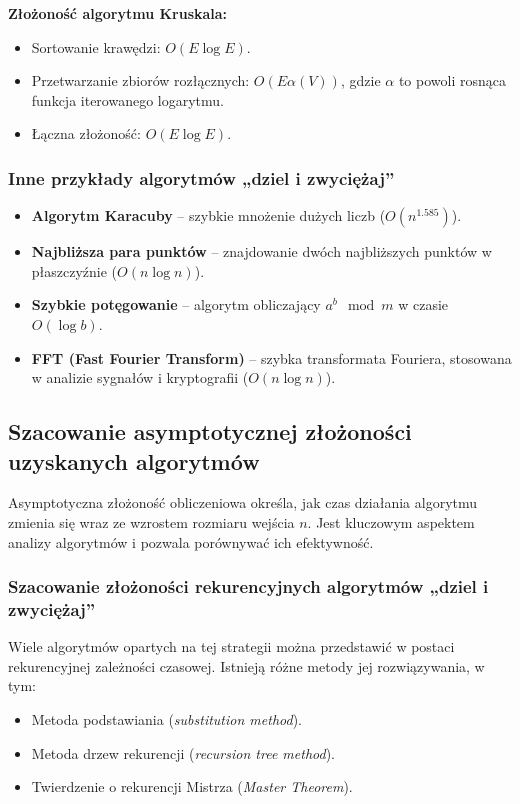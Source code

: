 \textbf{Złożoność algorytmu Kruskala:}
\begin{itemize}
    \item Sortowanie krawędzi: \( O(E \log E) \).
    \item Przetwarzanie zbiorów rozłącznych: \( O(E \alpha(V)) \), gdzie \( \alpha \) to powoli rosnąca funkcja iterowanego logarytmu.
    \item Łączna złożoność: \( O(E \log E) \).
\end{itemize}

\subsubsection{Inne przykłady algorytmów „dziel i zwyciężaj”}
\begin{itemize}
    \item \textbf{Algorytm Karacuby} – szybkie mnożenie dużych liczb (\( O(n^{1.585}) \)).
    \item \textbf{Najbliższa para punktów} – znajdowanie dwóch najbliższych punktów w płaszczyźnie (\( O(n \log n) \)).
    \item \textbf{Szybkie potęgowanie} – algorytm obliczający \( a^b \mod m \) w czasie \( O(\log b) \).
    \item \textbf{FFT (Fast Fourier Transform)} – szybka transformata Fouriera, stosowana w analizie sygnałów i kryptografii (\( O(n \log n) \)).
\end{itemize}
\subsection{Szacowanie asymptotycznej złożoności uzyskanych algorytmów}

Asymptotyczna złożoność obliczeniowa określa, jak czas działania algorytmu zmienia się wraz ze wzrostem rozmiaru wejścia \( n \). Jest kluczowym aspektem analizy algorytmów i pozwala porównywać ich efektywność.

\subsubsection{Szacowanie złożoności rekurencyjnych algorytmów „dziel i zwyciężaj”}

Wiele algorytmów opartych na tej strategii można przedstawić w postaci rekurencyjnej zależności czasowej. Istnieją różne metody jej rozwiązywania, w tym:

\begin{itemize}
    \item Metoda podstawiania (\textit{substitution method}).
    \item Metoda drzew rekurencji (\textit{recursion tree method}).
    \item Twierdzenie o rekurencji Mistrza (\textit{Master Theorem}).
\end{itemize}

